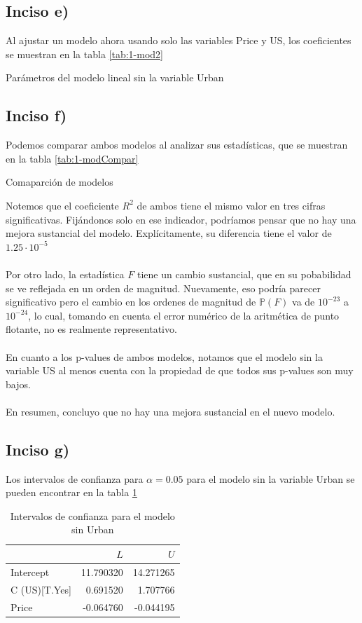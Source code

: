 \documentclass[11pt]{article}
\begin{document}
\subsection{Inciso e)}
Al ajustar un modelo ahora usando solo las variables Price y US, los coeficientes se muestran en la tabla \ref{tab:1-mod2}
\begin{table}[H]
    \centering
    \label{tab:1-mod2}
    
    \caption{Parámetros del modelo lineal sin la variable Urban}
\end{table}
\subsection{Inciso f)}
Podemos comparar ambos modelos al analizar sus estadísticas, que se muestran en la tabla \ref{tab:1-modCompar}
\begin{table}[H]
    \centering
    
    \caption{Comaparción de modelos}
    \label{tab:1-modCompar}
\end{table} 
Notemos que el coeficiente $R^2$ de ambos tiene el mismo valor en tres cifras significativas. Fijándonos solo en ese indicador, podríamos pensar que no hay una mejora sustancial del modelo. Explícitamente, su diferencia tiene el valor de $1.25 \cdot 10^{-5}$
\\
\\Por otro lado, la estadística $F$ tiene un cambio sustancial, que en su pobabilidad se ve reflejada en un orden de magnitud. Nuevamente, eso podría parecer significativo pero el cambio en los ordenes de magnitud de $\mathbb{P}(F)$ va de $10^{-23}$ a $10^{-24}$, lo cual, tomando en cuenta el error numérico de la aritmética de punto flotante, no es realmente representativo.
\\
\\En cuanto a los p-values de ambos modelos, notamos que el modelo sin la variable US al menos cuenta con la propiedad de que todos sus p-values son muy bajos.
\\
\\En resumen, concluyo que no hay una mejora sustancial en el nuevo modelo.
\subsection{Inciso g)}
Los intervalos de confianza para $\alpha = 0.05$ para el modelo sin la variable Urban se pueden encontrar en la tabla \ref{tab:1-inter}
\begin{table}[H]
    \centering
    \begin{tabular}{lrr}
        \hline 
        &  $L$ & $U $ \\
        \hline 
        Intercept &    11.790320 & 14.271265 \\
        C (US)[T.Yes] &  0.691520  & 1.707766 \\
        Price &        -0.064760 & -0.044195 \\
        \hline 
    \end{tabular}
    \caption{Intervalos de confianza para el modelo sin Urban}
    \label{tab:1-inter}
\end{table}
\end{document}
